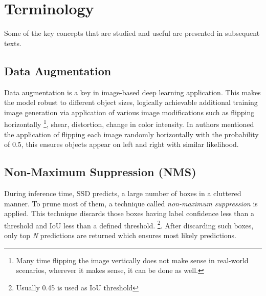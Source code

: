 
\section{Terminology}
Some of the key concepts that are studied and useful are presented in subsequent texts.

\subsection{Data Augmentation}
Data augmentation is a key in image-based deep learning application. This makes the model robust to different object sizes, logically achievable  additional training image generation via application of various image modifications such as flipping horizontally \footnote{Many time flipping the image vertically does not make sense in real-world scenarios, wherever it makes sense, it can be done as well.}, shear, distortion, change in color intensity. In \cite{liu2016ssd} authors mentioned the application of flipping each image randomly horizontally with the probability of 0.5, this ensures objects appear on left and right with similar likelihood.

\subsection{Non-Maximum Suppression (NMS)}
During inference time, SSD predicts, a large number of boxes in a cluttered manner. To prune most of them, a technique called \textit{non-maximum suppression} is applied. This technique discards those boxes having label confidence less than a threshold and IoU less than a defined threshold. \footnote{Usually 0.45 is used as IoU threshold}. After discarding such boxes, only top \textit{N} predictions are returned which ensures most likely predictions.
